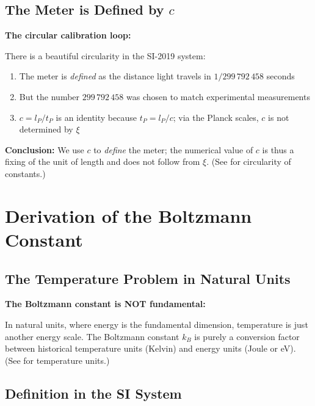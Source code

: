 	\subsection{The Meter is Defined by $c$}
	
	\begin{insight}
		\textbf{The circular calibration loop:}
		
		There is a beautiful circularity in the SI-2019 system:
		
		\begin{enumerate}
			\item The meter is \emph{defined} as the distance light travels in $1/299\,792\,458$ seconds
			\item But the number $299\,792\,458$ was chosen to match experimental measurements
			\item $c = l_P/t_P$ is an identity because $t_P = l_P/c$; via the Planck scales, $c$ is not determined by $\xi$
		\end{enumerate}
		
		\textbf{Conclusion:} We use $c$ to \emph{define} the meter; the numerical value of $c$ is thus a fixing of the unit of length and does not follow from $\xi$. (See \cite{circularity_constants_En} for circularity of constants.)
	\end{insight}
	
	\section{Derivation of the Boltzmann Constant}
	
	\subsection{The Temperature Problem in Natural Units}
	
	\begin{warning}
		\textbf{The Boltzmann constant is NOT fundamental:}
		
		In natural units, where energy is the fundamental dimension, temperature is just another energy scale. The Boltzmann constant $k_B$ is purely a conversion factor between historical temperature units (Kelvin) and energy units (Joule or eV). (See \cite{temperature_units_CMB_En} for temperature units.)
	\end{warning}
	
	\subsection{Definition in the SI System}
	
